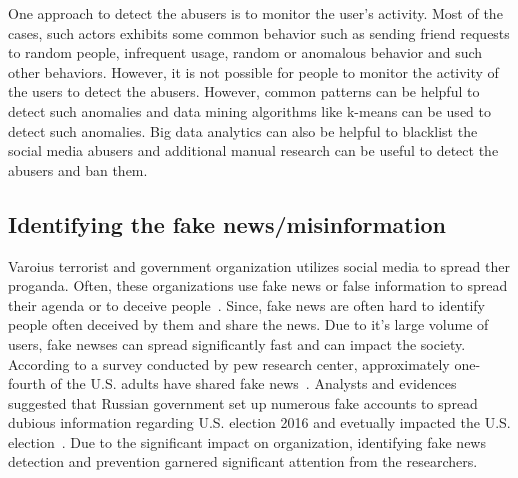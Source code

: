 \documentclass[sigconf]{acmart}
\begin{document}
One approach to detect the abusers is to monitor the user's activity. Most of the cases, such actors exhibits some common behavior such as sending friend requests to random people, infrequent usage, random or anomalous behavior and such other behaviors. However, it is not possible for people to monitor the activity of the users to detect the abusers. However, common patterns can be helpful to detect such anomalies and data mining algorithms like k-means can be used to detect such anomalies. Big data analytics can also be helpful to blacklist the social media abusers and additional manual research can be useful to detect the abusers and ban them. 


\subsection{Identifying the fake news/misinformation }
Varoius terrorist and government organization utilizes social media to spread ther proganda. Often, these organizations use fake news or false information to spread their agenda or to deceive people~\cite{Aymanns:2017}.  Since, fake news are often hard to identify people often deceived by them and share the news. Due to it's large volume of users, fake newses can spread significantly fast and can impact the society. According to a survey conducted by pew research center, approximately one-fourth of the U.S. adults have shared fake news~\cite{fake2}. Analysts and evidences suggested that Russian government  set up numerous fake accounts to spread dubious information regarding U.S. election 2016 and evetually impacted the U.S. election~\cite{fake2,Allcott:2017}.  Due to the significant impact on organization, identifying fake news detection and prevention garnered significant attention from  the researchers.
\end{document}
